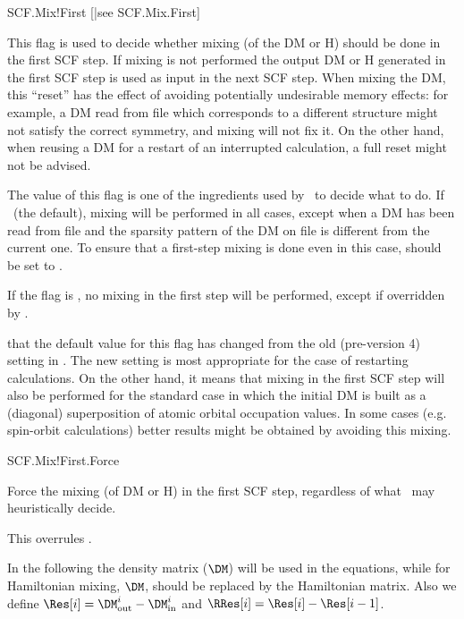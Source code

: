 \begin{fdflogicalT}{SCF.Mix!First}
  [|see SCF.Mix.First]

  This flag is used to decide whether mixing (of the DM or H) should
  be done in the first SCF step. If mixing is not performed the output
  DM or H generated in the first SCF step is used as input in the next
  SCF step. When mixing the DM, this ``reset'' has the effect of
  avoiding potentially undesirable memory effects: for example, a DM
  read from file which corresponds to a different structure might not
  satisfy the correct symmetry, and mixing will not fix it. On the
  other hand, when reusing a DM for a restart of an interrupted
  calculation, a full reset might not be advised.
  
  The value of this flag is one of the ingredients used by \siesta\ to
  decide what to do. If \fdftrue\ (the default), mixing will be
  performed in all cases, except when a DM has been read from file and
  the sparsity pattern of the DM on file is different from the current
  one. To ensure that a first-step mixing is done even in this case,
   should be set to \fdftrue.
  
  If the flag is \fdffalse, no mixing in the first step will be
  performed, except if overridden by .
  
  \note that the default value for this flag has changed from the old
  (pre-version 4) setting in \siesta. The new setting is most
  appropriate for the case of restarting calculations. On the other
  hand, it means that mixing in the first SCF step will also be
  performed for the standard case in which the initial DM is built as
  a (diagonal) superposition of atomic orbital occupation values. In
  some cases (e.g. spin-orbit calculations) better results might be
  obtained by avoiding this mixing.

\end{fdflogicalT}

\begin{fdflogicalF}{SCF.Mix!First.Force}

  Force the mixing (of DM or H) in the first SCF step, regardless of
  what \siesta\ may heuristically decide.

  This overrules .
  
\end{fdflogicalF}


In the following the density matrix ($\DM$) will be used in the
equations, while for Hamiltonian mixing, $\DM$, should be replaced by
the Hamiltonian matrix.
%
Also we define $\Res[i] = \DM^i_{\mathrm{out}} - \DM^i_{\mathrm{in}}$ and 
$\RRes[i] = \Res[i] - \Res[i-1]$.

